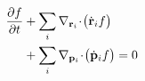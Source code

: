 \documentclass[preview]{standalone}
\begin{document}
\begin{align*}
\special{dvisvgm:raw <g id='unique000'>}\pdv{f}{t}&+\sum_{i}\nabla_{\va r_i}\!\cdot\!\big(\dot{\va r}_i f\big)\\&+\sum_{i}\nabla_{\va p_i}\!\cdot\!\big(\dot{\va p}_i f\big)=0\special{dvisvgm:raw </g>}
\end{align*}
\end{document}
